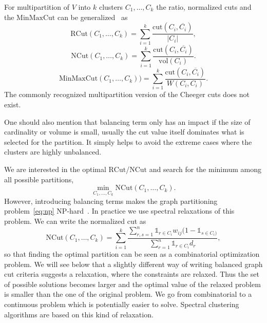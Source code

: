 For multipartition of $V$ into $k$ clusters $C_1,\dots,C_k$ the ratio, normalized cuts and the $\mathrm{MinMaxCut}$ can be generalized~\cite{Luxb07} as
\begin{equation}
\mathrm{RCut}(C_1,\dots,C_k) =  \sum \limits_{i=1}^k \frac{\mathrm{cut}(C_i,\overline{C_i})}{\lvert C_i \rvert} ,
\end{equation}
\begin{equation}
\mathrm{NCut}(C_1,\dots,C_k) =  \sum \limits_{i=1}^k \frac{\mathrm{cut}(C_i,\overline{C_i})}{\mathrm{vol}(C_i)}.
\end{equation}
\begin{equation}
 \mathrm{MinMaxCut}(C_1,\dots,C_k)) = \sum \limits_{i=1}^k \frac{\mathrm{cut}(C_i,\overline{C_i})}{W(C_i,C_i)}.
\end{equation}
The commonly recognized multipartition version of the Cheeger cuts does not exist.

One should also mention that balancing term only has an impact 
if the size of cardinality or volume is small, usually the cut value itself dominates what is selected for the partition. It simply helps to avoid the extreme
cases where the clusters are highly unbalanced.

We are interested in the optimal $\mathrm{RCut}$/$\mathrm{NCut}$ and search for the minimum among all possible partitions,
\begin{equation}
\label{eq:np}
\min\limits_{C_1,\dots,C_k} \mathrm{NCut}(C_1,\dots,C_k).
\end{equation}
However, introducing balancing terms makes the graph partitioning problem~\eqref{eq:np} NP-hard~\cite{Wagner93}. In practice we use spectral relaxations of this problem. 
We can write the normalized cut as
\begin{equation*}
\mathrm{NCut}(C_1,\dots,C_k) = \sum \limits_{i=1}^k \frac{\sum _{r,s=1}^n \mathds{1}_{r \in C_i} w_{ij} (1 - \mathds{1}_{s \in C_i)}}{\sum_{r=1}^n \mathds{1}_{r \in C_i} d_r},
\end{equation*}
so that finding the optimal partition can be seen as a combinatorial optimization problem. We will see below that a slightly different way of writing balanced graph cut criteria suggests a relaxation, where 
the constraints are relaxed. Thus the set of possible solutions becomes larger and the optimal value of the relaxed problem is smaller than the one of the original problem. We go from combinatorial 
to a continuous problem which is potentially easier to solve. Spectral clustering algorithms are based on this kind of relaxation.
